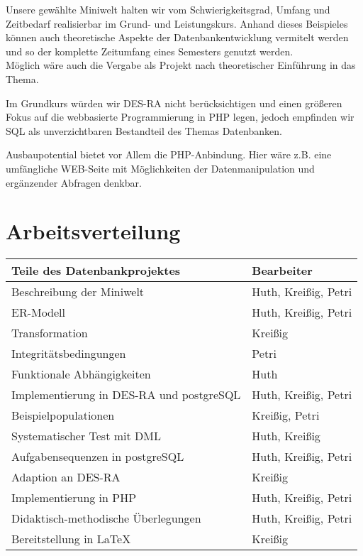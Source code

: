 \documentclass[pagesize,11pt,twoside]{scrartcl}
\begin{document}
Unsere gewählte Miniwelt halten wir vom Schwierigkeitsgrad, Umfang und Zeitbedarf realisierbar im Grund- und Leistungskurs.
Anhand dieses Beispieles können auch theoretische Aspekte der Datenbankentwicklung vermitelt werden und so der komplette Zeitumfang 
eines Semesters genutzt werden. \\
Möglich wäre auch die Vergabe als Projekt nach theoretischer Einführung in das Thema.

Im Grundkurs würden wir DES-RA nicht berücksichtigen und einen größeren Fokus auf die webbasierte Programmierung in PHP legen, jedoch empfinden wir SQL
 als unverzichtbaren Bestandteil des Themas Datenbanken.

Ausbaupotential bietet vor Allem die PHP-Anbindung. Hier wäre z.B. eine umfängliche WEB-Seite mit Möglichkeiten der Datenmanipulation
und ergänzender Abfragen denkbar.
\section{Arbeitsverteilung}
\begin{tabular}{ll}
Teile des Datenbankprojektes & Bearbeiter\\\hline
Beschreibung der Miniwelt&Huth, Kreißig, Petri\\
ER-Modell&Huth, Kreißig, Petri\\
Transformation&Kreißig\\
Integritätsbedingungen&Petri\\
Funktionale Abhängigkeiten&Huth\\
Implementierung in DES-RA und postgreSQL&Huth, Kreißig, Petri\\
Beispielpopulationen&Kreißig, Petri\\
Systematischer Test mit DML&Huth, Kreißig\\
Aufgabensequenzen in postgreSQL&Huth, Kreißig, Petri\\
Adaption an DES-RA&Kreißig\\
Implementierung in PHP&Huth, Kreißig, Petri\\
Didaktisch-methodische Überlegungen&Huth, Kreißig, Petri\\
Bereitstellung in \LaTeX &Kreißig
\end{tabular}
\end{document}
